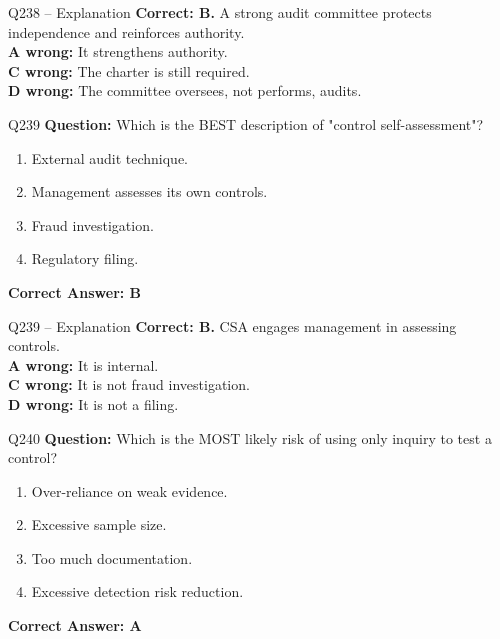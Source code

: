 \documentclass[aspectratio=169,10pt]{beamer}
\begin{document}
	\begin{frame}[t]{Q238 -- Explanation}
		\small
		\textbf{Correct: B.} A strong audit committee protects independence and reinforces authority. \\[4pt]
		\textbf{A wrong:} It strengthens authority. \\[2pt]
		\textbf{C wrong:} The charter is still required. \\[2pt]
		\textbf{D wrong:} The committee oversees, not performs, audits.
	\end{frame}
	
	\begin{frame}[t]{Q239}
		\small
		\textbf{Question:} Which is the BEST description of "control self-assessment"?
		\begin{enumerate}[label=\Alph*.,itemsep=1pt,topsep=2pt]
			\item External audit technique.
			\item Management assesses its own controls.
			\item Fraud investigation.
			\item Regulatory filing.
		\end{enumerate}
		\vspace{4pt}
		\textbf{Correct Answer: B}
	\end{frame}
	
	\begin{frame}[t]{Q239 -- Explanation}
		\small
		\textbf{Correct: B.} CSA engages management in assessing controls. \\[4pt]
		\textbf{A wrong:} It is internal. \\[2pt]
		\textbf{C wrong:} It is not fraud investigation. \\[2pt]
		\textbf{D wrong:} It is not a filing.
	\end{frame}
	
	\begin{frame}[t]{Q240}
		\small
		\textbf{Question:} Which is the MOST likely risk of using only inquiry to test a control?
		\begin{enumerate}[label=\Alph*.,itemsep=1pt,topsep=2pt]
			\item Over-reliance on weak evidence.
			\item Excessive sample size.
			\item Too much documentation.
			\item Excessive detection risk reduction.
		\end{enumerate}
		\vspace{4pt}
		\textbf{Correct Answer: A}
	\end{frame}
	
\end{document}

